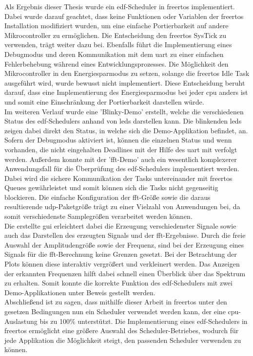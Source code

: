 \documentclass[../EDF Master Thesis.tex]{subfiles}
\begin{document}
    Als Ergebnis dieser Thesis wurde ein \ac{edf}-Scheduler in \ac{freertos} implementiert.
    Dabei wurde darauf geachtet, dass keine Funktionen oder Variablen der \ac{freertos} Installation modifiziert wurden, um eine einfache Portierbarkeit auf andere Mikrocontroller zu ermöglichen.
    Die Entscheidung den \ac{freertos} SysTick zu verwenden, trägt weiter dazu bei.
    Ebenfalls führt die Implementierung eines Debugmodus und deren Kommunikation mit dem \ac{uart} zu einer einfachen Fehlerbehebung während eines Entwicklungsprozesses.
    Die Möglichkeit den Mikrocontroller in den Energiesparmodus zu setzen, solange die \ac{freertos} Idle Task ausgeführt wird, wurde bewusst nicht implementiert.
    Diese Entscheidung beruht darauf, dass eine Implementierung des Energiesparmodus bei jeder \ac{cpu} anders ist und somit eine Einschränkung der Portierbarkeit darstellen würde.\\
    Im weiteren Verlauf wurde eine 'Blinky-Demo' erstellt, welche die verschiedenen Status des \ac{edf}-Schedulers anhand von \ac{led}s darstellen kann.
    Die blinkenden \ac{led}s zeigen dabei direkt den Status, in welche sich die Demo-Applikation befindet, an.
    Sofern der Debugmodus aktiviert ist, können die einzelnen Status und wenn vorhanden, die nicht eingehalten Deadlines mit der Hilfe des \ac{uart} mit verfolgt werden.
    Außerdem konnte mit der '\ac{fft}-Demo' auch ein wesentlich komplexerer Anwendungsfall für die Überprüfung des \ac{edf}-Schedulers implementiert werden.
    Dabei wird die sichere Kommunikation der Tasks untereinander mit \ac{freertos} Queues gewährleistet und somit können sich die Tasks nicht gegenseitig blockieren.
    Die einfache Konfiguration der \ac{fft}-Größe sowie die daraus resultierende \ac{udp}-Paketgröße trägt zu einer Vielzahl von Anwendungen bei, da somit verschiedenste Samplegrößen verarbeitet werden können.\\
    Die erstellte \ac{gui} erleichtert dabei die Erzeugung verschiedenster Signale sowie auch das Darstellen des erzeugten Signals und der \ac{fft}-Ergebnisse.
    Durch die freie Auswahl der Amplitudengröße sowie der Frequenz, sind bei der Erzeugung eines Signals für die \ac{fft}-Berechnung keine Grenzen gesetzt.
    Bei der Betrachtung der Plots können diese interaktiv vergrößert und verkleinert werden.
    Das Anzeigen der erkannten Frequenzen hilft dabei schnell einen Überblick über das Spektrum zu erhalten.
    Somit konnte die korrekte Funktion des \ac{edf}-Schedulers mit zwei Demo-Applikationen unter Beweis gestellt werden.\\
    Abschließend ist zu sagen, dass mithilfe dieser Arbeit in \ac{freertos} unter den gesetzen Bedingungen nun ein Scheduler verwendet werden kann, der eine \ac{cpu}-Auslastung bis zu 100\% unterstützt.
    Die Implementierung eines \ac{edf}-Schedulers in \ac{freertos} ermöglicht eine größere Auswahl des Scheduler-Betriebes, wodurch für jede Applikation die Möglichkeit steigt, den passenden Scheduler verwenden zu können.
\end{document}
